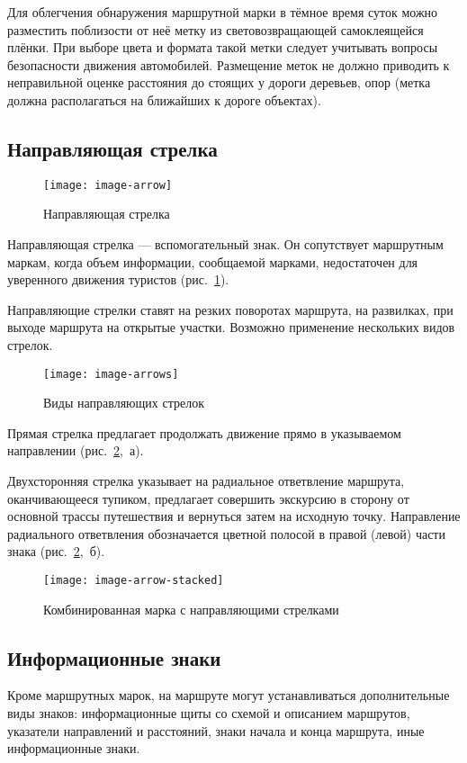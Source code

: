 \documentclass[a4paper,12pt,titlepage]{extarticle}
\begin{document}
Для облегчения обнаружения маршрутной марки в тёмное время суток можно разместить поблизости от неё метку из световозвращающей самоклеящейся
плёнки. При выборе цвета и формата такой метки следует учитывать вопросы безопасности движения автомобилей. Размещение
меток не должно приводить к неправильной оценке расстояния до стоящих у дороги деревьев, опор
(метка должна располагаться на ближайших к дороге объектах).

\subsection{Направляющая стрелка}
\begin{figure}
	\centering
	\texttt{[image: image-arrow]}
	\caption{Направляющая стрелка}\label{fig:arrow}
\end{figure}

Направляющая стрелка --- вспомогательный знак. Он сопутствует маршрутным маркам, когда объем информации, сообщаемой
марками, недостаточен для уверенного движения туристов (рис.~\ref{fig:arrow}).

Направляющие стрелки ставят на резких поворотах маршрута, на развилках, при выходе маршрута на открытые участки.
Возможно применение нескольких видов стрелок.

\begin{figure}
	\centering
	\texttt{[image: image-arrows]}
	\caption{Виды направляющих стрелок}\label{fig:arrows}
\end{figure}

Прямая стрелка предлагает продолжать движение прямо в указываемом направлении (рис.~\ref{fig:arrows},~а).

Двухсторонняя стрелка указывает на радиальное ответвление маршрута, оканчивающееся тупиком, предлагает
совершить экскурсию в сторону от основной трассы путешествия и вернуться затем на исходную точку. Направление
радиального ответвления обозначается цветной полосой в правой (левой) части знака (рис.~\ref{fig:arrows},~б).

\begin{figure}[ht]
	\centering
	\texttt{[image: image-arrow-stacked]}
	\caption{Комбинированная марка с направляющими стрелками}\label{fig:arrow-stacked}
\end{figure}


\subsection{Информационные знаки}
Кроме маршрутных марок, на маршруте могут устанавливаться дополнительные виды знаков: информационные щиты со схемой и
описанием маршрутов, указатели направлений и расстояний, знаки начала и конца маршрута, иные информационные знаки.
\end{document}

